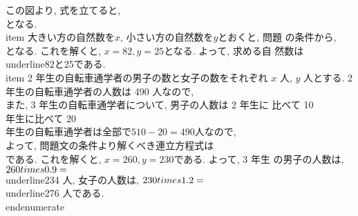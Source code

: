 	      この図より, 式を立てると,
	      \\[
	       \\begin{cases}
		x+180=30y\\\\
		2x+180=51y
	       \\end{cases}
	      \\]
	      となる.
	\\item 大きい方の自然数を$x$, 小さい方の自然数を$y$とおくと, 問題
	      の条件から,
	      \\[
	       \\begin{cases}
		x-y=57\\\\
		x=3y+7
	       \\end{cases}
	      \\]
	      となる. これを解くと, $x=82, y=25$となる. よって, 求める自
	      然数は\\underline{$82 と 25$}である. 
	\\item 2 年生の自転車通学者の男子の数と女子の数をそれぞれ $x$ 人,
	       $y$ 人とする. 2 年生の自転車通学者の人数は 490 人なので,
	      \\[
	       x+y=490
	      \\]
	      また, 3 年生の自転車通学者について, 男子の人数は 2 年生に
	      比べて 10\\%
	      年生に比べて 20\\%
	       年生の自転車通学者は全部で$510-20=490$人なので,
	      \\[
	       0.9x+1.2y=490
	      \\]
	      よって, 問題文の条件より解くべき連立方程式は
	      \\[
	       \\begin{cases}
		x+y=490\\\\
		0.9x+1.2y=510
	       \\end{cases}
	      \\]
	      である. これを解くと, $x=260, y=230$である. よって, 3 年生
	      の男子の人数は, $260\\times0.9=$ \\underline{234 人}, 女子の人数は,
	      $230\\times1.2=$ \\underline{276 人}である.
       \\end{enumerate}

